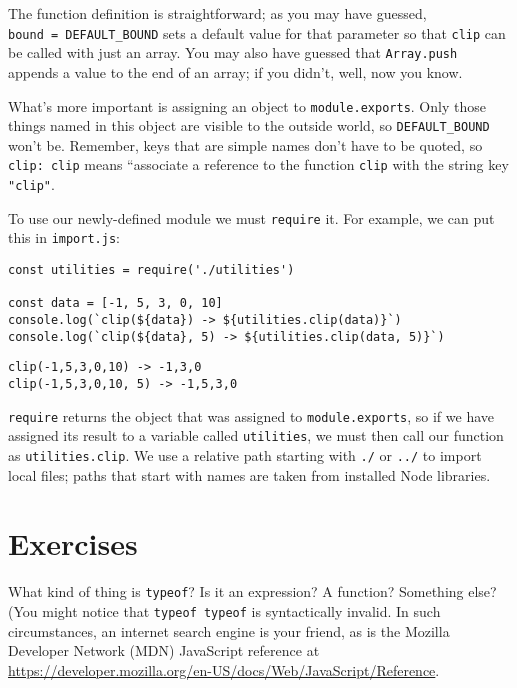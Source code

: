 The function definition is straightforward;
as you may have guessed, \texttt{bound\ =\ DEFAULT\_BOUND} sets a default value for that parameter
so that \texttt{clip} can be called with just an array.
You may also have guessed that \texttt{Array.push} appends a value to the end of an array;
if you didn't,
well,
now you know.

What's more important is assigning an object to \texttt{module.exports}.
Only those things named in this object are visible to the outside world,
so \texttt{DEFAULT\_BOUND} won't be.
Remember,
keys that are simple names don't have to be quoted,
so \texttt{clip:\ clip} means ``associate a reference to the function \texttt{clip} with the string key \texttt{"clip"}.

To use our newly-defined module we must \texttt{require} it.
For example,
we can put this in \texttt{import.js}:

\begin{verbatim}
const utilities = require('./utilities')

const data = [-1, 5, 3, 0, 10]
console.log(`clip(${data}) -> ${utilities.clip(data)}`)
console.log(`clip(${data}, 5) -> ${utilities.clip(data, 5)}`)
\end{verbatim}

\begin{verbatim}
clip(-1,5,3,0,10) -> -1,3,0
clip(-1,5,3,0,10, 5) -> -1,5,3,0
\end{verbatim}

\noindent
\texttt{require} returns the object that was assigned to \texttt{module.exports},
so if we have assigned its result to a variable called \texttt{utilities},
we must then call our function as \texttt{utilities.clip}.
We use a relative path starting with \texttt{./} or \texttt{../} to import local files;
paths that start with names are taken from installed Node libraries.


\section{Exercises}\label{s:basics-exercises}


What kind of thing is \texttt{typeof}?
Is it an expression?
A function?
Something else?
(You might notice that \texttt{typeof\ typeof} is syntactically invalid.
In such circumstances,
an internet search engine is your friend,
as is the Mozilla Developer Network (MDN) JavaScript reference
at \url{https://developer.mozilla.org/en-US/docs/Web/JavaScript/Reference}.

